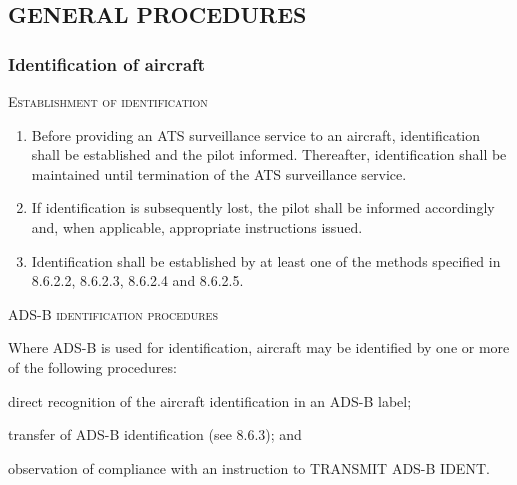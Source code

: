 \documentclass[../vATM.tex]{subfiles}
\begin{document}
    \subsection[General procedures]{GENERAL PROCEDURES}
    

    \subsubsection{Identification of aircraft}
    
    \begin{enumeratesc}
    	\item \textsc{Establishment of identification}
    	\begin{enumerate}
    		\item Before providing an ATS surveillance service to an aircraft, identification shall be established and the pilot informed. Thereafter, identification shall be maintained until termination of the ATS surveillance service.
    		\item If identification is subsequently lost, the pilot shall be informed accordingly and, when applicable, appropriate instructions issued.
    		\item Identification shall be established by at least one of the methods specified in 8.6.2.2, 8.6.2.3, 8.6.2.4 and 8.6.2.5.
    	\end{enumerate}
    
    	\item \textsc{ADS-B identification procedures}
    	\begin{enumempty}
    		\item Where ADS-B is used for identification, aircraft may be identified by one or more of the following procedures:
    	\end{enumempty}
    	\begin{enumalph}
    		\item direct recognition of the aircraft identification in an ADS-B label;
    		\item transfer of ADS-B identification (see 8.6.3); and
    		\item observation of compliance with an instruction to TRANSMIT ADS-B IDENT.
    	\end{enumalph}
    	

\end{enumeratesc}
\end{document}
